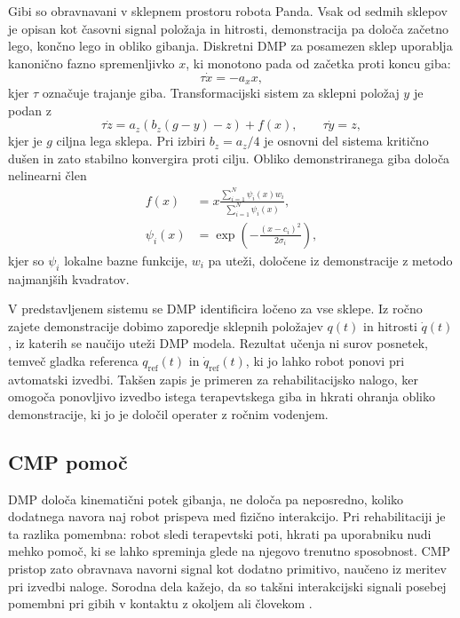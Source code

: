 \documentclass[a4paper]{article}
\begin{document}
Gibi so obravnavani v sklepnem prostoru robota Panda. Vsak od sedmih sklepov je
opisan kot časovni signal položaja in hitrosti, demonstracija pa določa začetno
lego, končno lego in obliko gibanja. Diskretni DMP za posamezen sklep uporablja
kanonično fazno spremenljivko $x$, ki monotono pada od začetka proti koncu giba:
\begin{equation}
    \tau \dot{x} = -a_x x ,
    \label{eq:canonical}
\end{equation}
kjer $\tau$ označuje trajanje giba. Transformacijski sistem za sklepni položaj
$y$ je podan z
\begin{equation}
    \tau \dot{z} = a_z \left(b_z (g-y) - z \right) + f(x),
    \qquad
    \tau \dot{y} = z ,
    \label{eq:transform}
\end{equation}
kjer je $g$ ciljna lega sklepa. Pri izbiri $b_z=a_z/4$ je osnovni del sistema
kritično dušen in zato stabilno konvergira proti cilju. Obliko demonstriranega
giba določa nelinearni člen
\begin{align}
    f(x) &=
    x\frac{\sum_{i=1}^{N} \psi_i(x) w_i}
         {\sum_{i=1}^{N} \psi_i(x)}, \nonumber\\
    \psi_i(x) &= \exp\left(-\frac{(x-c_i)^2}{2\sigma_i}\right),
    \label{eq:forcing}
\end{align}
kjer so $\psi_i$ lokalne bazne funkcije, $w_i$ pa uteži, določene iz
demonstracije z metodo najmanjših kvadratov.

V predstavljenem sistemu se DMP identificira ločeno za vse sklepe. Iz ročno
zajete demonstracije dobimo zaporedje sklepnih položajev $q(t)$ in hitrosti
$\dot{q}(t)$, iz katerih se naučijo uteži DMP modela. Rezultat učenja ni surov
posnetek, temveč gladka referenca $q_\mathrm{ref}(t)$ in
$\dot{q}_\mathrm{ref}(t)$, ki jo lahko robot ponovi pri avtomatski izvedbi.
Takšen zapis je primeren za rehabilitacijsko nalogo, ker omogoča ponovljivo
izvedbo istega terapevtskega giba in hkrati ohranja obliko demonstracije, ki jo
je določil operater z ročnim vodenjem.

\subsection{CMP pomoč}

DMP določa kinematični potek gibanja, ne določa pa neposredno, koliko dodatnega
navora naj robot prispeva med fizično interakcijo. Pri rehabilitaciji je ta
razlika pomembna: robot sledi terapevtski poti, hkrati pa uporabniku nudi mehko
pomoč, ki se lahko spreminja glede na njegovo trenutno sposobnost. CMP pristop
zato obravnava navorni signal kot dodatno primitivo, naučeno iz meritev pri
izvedbi naloge. Sorodna dela kažejo, da so takšni interakcijski signali posebej
pomembni pri gibih v kontaktu z okoljem ali človekom \cite{gams2014coupling}.
\end{document}
